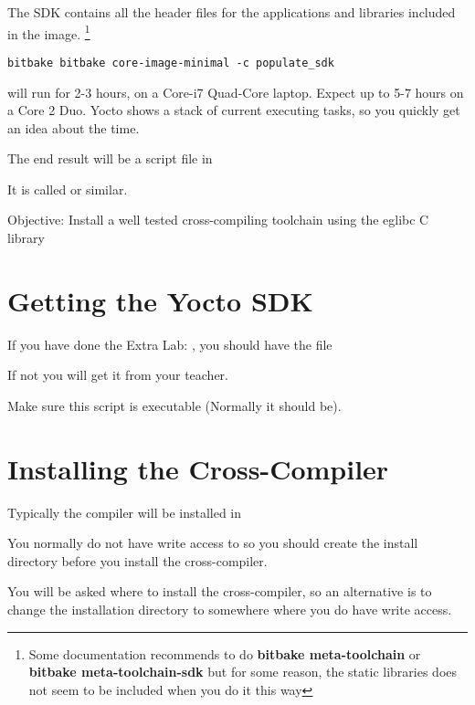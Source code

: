 The SDK contains all the header files for the applications and libraries included in the image. 
\footnote{Some documentation recommends to do {\bf bitbake meta-toolchain} or {\bf bitbake meta-toolchain-sdk}
but for some reason, the static libraries does not seem to be included when you do it this way}

\begin{verbatim}
bitbake bitbake core-image-minimal -c populate_sdk
\end{verbatim}

 will run for 2-3 hours, on a Core-i7 Quad-Core laptop.
Expect up to 5-7 hours on a Core 2 Duo.
Yocto shows a stack of current executing tasks,
so you quickly get an idea about the time.
 
The end result will be a script file in 

It is called 
or similar.

  {Objective: Install a well tested cross-compiling toolchain using the eglibc C
  library}

\section{Getting the Yocto SDK}

If you have done the Extra Lab: , 
you should have the file


If not you will get it from your teacher.

Make sure this script is executable (Normally it should be).

\section{Installing the Cross-Compiler}

Typically the compiler will be installed in 

You normally do not have write access to  so you should
create the install directory before you install the cross-compiler.

You will be asked where to install the cross-compiler, so an alternative 
is to change the installation directory to somewhere where you do have write access.

